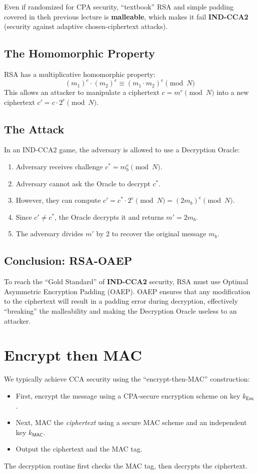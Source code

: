 Even if randomized for CPA security, ``textbook'' RSA and simple padding covered in theh previous lecture is \textbf{malleable}, which makes it fail \textbf{IND-CCA2} (security against adaptive chosen-ciphertext attacks).

\subsection{The Homomorphic Property}
RSA has a multiplicative homomorphic property:
\[ (m_1)^e \cdot (m_2)^e \equiv (m_1 \cdot m_2)^e \pmod N \]
This allows an attacker to manipulate a ciphertext $c = m^e \pmod N$ into a new ciphertext $c' = c \cdot 2^e \pmod N$. 

\subsection{The Attack}
In an IND-CCA2 game, the adversary is allowed to use a Decryption Oracle:
\begin{enumerate}
    \item Adversary receives challenge $c^* = m_b^e \pmod N$.
    \item Adversary cannot ask the Oracle to decrypt $c^*$.
    \item However, they can compute $c' = c^* \cdot 2^e \pmod N = (2m_b)^e \pmod N$.
    \item Since $c' \neq c^*$, the Oracle decrypts it and returns $m' = 2m_b$.
    \item The adversary divides $m'$ by 2 to recover the original message $m_b$.
\end{enumerate}

\subsection{Conclusion: RSA-OAEP}
To reach the ``Gold Standard'' of \textbf{IND-CCA2} security, RSA must use Optimal Asymmetric Encryption Padding (OAEP). OAEP ensures that any modification to the ciphertext will result in a padding error during decryption, effectively ``breaking'' the malleability and making the Decryption Oracle useless to an attacker.

\section{Encrypt then MAC}
We typically achieve CCA security using the ``encrypt-then-MAC'' construction:
\begin{itemize}
  \item First, encrypt the message using a CPA-secure encryption scheme on key $k_\mathsf{Enc}$.
  \item Next, MAC the \emph{ciphertext} using a secure MAC scheme and an independent key 
    $k_\mathsf{MAC}$.
  \item Output the ciphertext and the MAC tag.
\end{itemize}
The decryption routine first checks the MAC tag, then decrypts the ciphertext.

